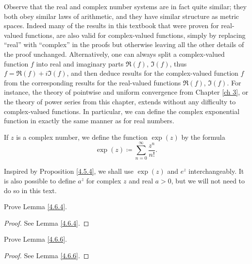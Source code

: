 \begin{note}
    Observe that the real and complex number systems are in fact quite similar;
    they both obey similar laws of arithmetic, and they have similar structure as metric spaces.
    Indeed many of the results in this textbook that were proven for real-valued functions, are also valid for complex-valued functions, simply by replacing ``real'' with ``complex'' in the proofs but otherwise leaving all the other details of the proof unchanged.
    Alternatively, one can always split a complex-valued function \(f\) into real and imaginary parts \(\Re(f)\), \(\Im(f)\), thus \(f = \Re(f) + i \Im(f)\), and then deduce results for the complex-valued function \(f\) from the corresponding results for the real-valued functions \(\Re(f)\), \(\Im(f)\).
    For instance, the theory of pointwise and uniform convergence from Chapter \ref{ch 3}, or the theory of power series from this chapter, extends without any difficulty to complex-valued functions.
    In particular, we can define the complex exponential function in exactly the same manner as for real numbers.
\end{note}

\begin{definition}\label{4.6.15}
    If \(z\) is a complex number, we define the function \(\exp(z)\) by the formula
    \[
        \exp(z) \coloneqq \sum_{n = 0}^\infty \frac{z^n}{n!}.
    \]
\end{definition}

\begin{note}
    Inspired by Proposition \ref{4.5.4}, we shall use \(\exp(z)\) and \(e^z\) interchangeably.
    It is also possible to define \(a^z\) for complex \(z\) and real \(a > 0\), but we will not need to do so in this text.
\end{note}

\exercisesection

\begin{exercise}\label{ex 4.6.1}
    Prove Lemma \ref{4.6.4}.
\end{exercise}

\begin{proof}
    See Lemma \ref{4.6.4}.
\end{proof}

\begin{exercise}\label{ex 4.6.2}
    Prove Lemma \ref{4.6.6}.
\end{exercise}

\begin{proof}
    See Lemma \ref{4.6.6}.
\end{proof}

